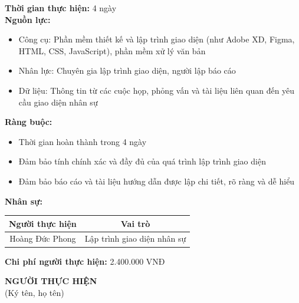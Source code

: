 {\begin{minipage}{\textwidth}
\begin{itemize}
    \end{itemize}
    \vspace{0.5cm}
    \noindent \textbf{Thời gian thực hiện:} 4 ngày \\
    \noindent \textbf{Nguồn lực:}
    \begin{itemize}
        \item Công cụ: Phần mềm thiết kế và lập trình giao diện (như Adobe XD, Figma, HTML, CSS, JavaScript), phần mềm xử lý văn bản
        \item Nhân lực: Chuyên gia lập trình giao diện, người lập báo cáo
        \item Dữ liệu: Thông tin từ các cuộc họp, phỏng vấn và tài liệu liên quan đến yêu cầu giao diện nhân sự
    \end{itemize}
    \vspace{0.5cm}
    \noindent \textbf{Ràng buộc:}
    \begin{itemize}
        \item Thời gian hoàn thành trong 4 ngày
        \item Đảm bảo tính chính xác và đầy đủ của quá trình lập trình giao diện
        \item Đảm bảo báo cáo và tài liệu hướng dẫn được lập chi tiết, rõ ràng và dễ hiểu
    \end{itemize}
    \vspace{0.5cm}
    \noindent \textbf{Nhân sự:}
    \begin{longtable}{|c|c|}
    \hline
    \textbf{Người thực hiện} & \textbf{Vai trò} \\
    \hline
    Hoàng Đức Phong & Lập trình giao diện nhân sự \\
    \hline
    \end{longtable}
    \vspace{0.5cm}
    \noindent \textbf{Chi phí người thực hiện:} 2.400.000 VNĐ \\
    \vspace{1cm}
    \begin{flushleft}
        \hspace{8cm} \textbf{NGƯỜI THỰC HIỆN} \\
        \hspace{8.8cm} (Ký tên, họ tên) \\
        \vspace{1cm}
    \end{flushleft}
    \end{minipage}
}
% 
